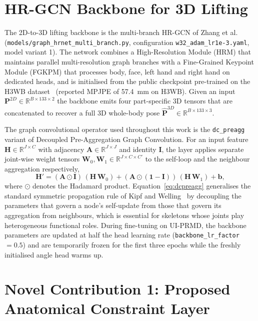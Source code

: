 \section{HR-GCN Backbone for 3D Lifting}
\label{sec:hrgcn}

The 2D-to-3D lifting backbone is the multi-branch HR-GCN of Zhang et
al.~\cite{zhang2025hrgcn} (\texttt{models/graph\_hrnet\_multi\_branch.py},
configuration \texttt{w32\_adam\_lr1e-3.yaml}, model variant 1).
The network combines a High-Resolution Module (HRM) that maintains
parallel multi-resolution graph branches with a Fine-Grained Keypoint
Module (FGKPM) that processes body, face, left hand and right hand on
dedicated heads, and is initialised from the public checkpoint
pre-trained on the H3WB dataset~\cite{Zhu2023H3WB} (reported MPJPE of
57.4~mm on H3WB). Given an input
$\mathbf{P}^{2D}\!\in\!\mathbb{R}^{B\times 133\times 2}$ the backbone
emits four part-specific 3D tensors that are concatenated to recover a
full 3D whole-body pose
$\hat{\mathbf{P}}^{3D}\!\in\!\mathbb{R}^{B\times 133\times 3}$.

The graph convolutional operator used throughout this work is the
\texttt{dc\_preagg} variant of Decoupled Pre-Aggregation Graph
Convolution. For an input feature $\mathbf{H}\!\in\!\mathbb{R}^{J\times C}$
with adjacency $\mathbf{A}\!\in\!\mathbb{R}^{J\times J}$ and identity
$\mathbf{I}$, the layer applies separate joint-wise weight tensors
$\mathbf{W}_{0}, \mathbf{W}_{1}\!\in\!\mathbb{R}^{J\times C\times C'}$
to the self-loop and the neighbour aggregation respectively,
\begin{equation}
\mathbf{H}' = (\mathbf{A}\odot\mathbf{I})\,(\mathbf{H}\,\mathbf{W}_{0})
            + (\mathbf{A}\odot(\mathbf{1}-\mathbf{I}))\,(\mathbf{H}\,\mathbf{W}_{1}) + \mathbf{b},
\label{eq:dcpreagg}
\end{equation}
where $\odot$ denotes the Hadamard product. Equation~\ref{eq:dcpreagg}
generalises the standard symmetric propagation rule of
Kipf and Welling~\cite{kipf2017semi} by decoupling the parameters that
govern a node's self-update from those that govern its aggregation
from neighbours, which is essential for skeletons whose joints play
heterogeneous functional roles. During fine-tuning on UI-PRMD, the
backbone parameters are updated at half the head learning rate
(\texttt{backbone\_lr\_factor}~$=0.5$) and are temporarily frozen for
the first three epochs while the freshly initialised angle head warms
up.

\section{Novel Contribution 1: Proposed Anatomical Constraint Layer}
\label{sec:n1-anatomical}

